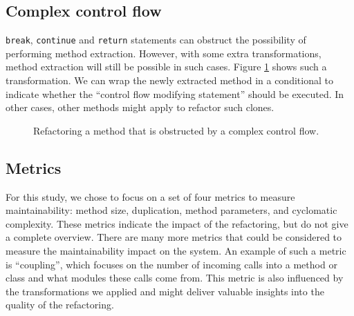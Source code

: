 \subsection{Complex control flow}
\texttt{break}, \texttt{continue} and \texttt{return} statements can obstruct the possibility of performing method extraction. However, with some extra transformations, method extraction will still be possible in such cases. Figure \ref{fig:complexcontrolflowrefactoring} shows such a transformation. We can wrap the newly extracted method in a conditional to indicate whether the ``control flow modifying statement'' should be executed. In other cases, other methods might apply to refactor such clones.

\begin{figure}[H]
\begin{parcolumns}{2}
\end{parcolumns}
\caption{Refactoring a method that is obstructed by a complex control flow.}
\label{fig:complexcontrolflowrefactoring}
\end{figure}

\subsection{Metrics}
For this study, we chose to focus on a set of four metrics to measure maintainability: method size, duplication, method parameters, and cyclomatic complexity. These metrics indicate the impact of the refactoring, but do not give a complete overview. There are many more metrics that could be considered to measure the maintainability impact on the system. An example of such a metric is ``coupling'', which focuses on the number of incoming calls into a method or class and what modules these calls come from. This metric is also influenced by the transformations we applied and might deliver valuable insights into the quality of the refactoring.

